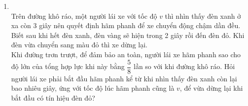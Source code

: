 \begin{enumerate}[label=\bfseries Bài \arabic*:,leftmargin=1.5cm]
{}

\item {}\\
Trên đường khô ráo, một người lái xe với tốc độ $v$ thì nhìn thấy đèn xanh ở xa còn 3 giây nên quyết định hãm phanh để xe chuyển động chậm dần đều. Biết sau khi hết đèn xanh, đèn vàng sẽ hiện trong 2 giây rồi đến đèn đỏ. Khi đèn vừa chuyển sang màu đỏ thì xe dừng lại.\\
Khi đường trơn trượt, để đảm bảo an toàn, người lái xe hãm phanh sao cho độ lớn của tổng hợp lực khi này bằng $\dfrac{5}{8}$ lần so với khi đường khô ráo. Hỏi người lái xe phải bắt đầu hãm phanh kể từ khi nhìn thấy đèn xanh còn lại bao nhiêu giây, ứng với tốc độ lúc hãm phanh cũng là $v$, để vừa dừng lại khi bắt đầu có tín hiệu đèn đỏ?


\end{enumerate}
